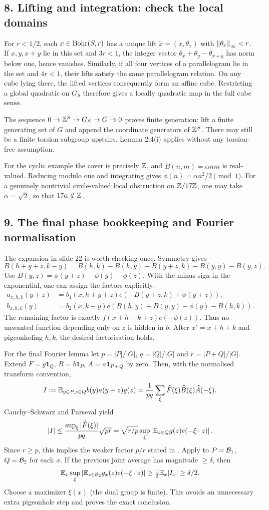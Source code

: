 \subsection*{8. Lifting and integration: check the local domains}
For $r<1/2$, each $x\in\operatorname{Bohr}(S,r)$ has a unique lift
$\widetilde x=(x,\theta_x)$ with $\left\|\theta_x\right\|_\infty<r$.
If $x,y,x+y$ lie in this set and $3r<1$, the integer vector
$\theta_x+\theta_y-\theta_{x+y}$ has norm below one, hence vanishes.
Similarly, if all four vertices of a parallelogram lie in the set and
$4r<1$, their lifts satisfy the same parallelogram relation. On any cube
lying there, the lifted vertices consequently form an affine cube.
Restricting a global quadratic on $G_S$ therefore gives a locally
quadratic map in the full cube sense.

The sequence $0\to\mathbb Z^S\to G_S\to G\to0$ proves finite generation:
lift a finite generating set of $G$ and append the coordinate generators
of $\mathbb Z^S$. There may still be a finite torsion subgroup upstairs.
Lemma 2.4(i) applies without any torsion-free assumption.

For the cyclic example the cover is precisely $\mathbb Z$, and
$\widetilde B(n,m)=\alpha nm$ is real-valued. Reducing modulo one and
integrating gives $\widetilde\phi(n)=\alpha n^2/2\pmod1$.
For a genuinely nontrivial circle-valued local obstruction on $\mathbb Z/17\mathbb Z$,
one may take $\alpha=\sqrt2$, so that $17\alpha\notin\mathbb Z$.

\subsection*{9. The final phase bookkeeping and Fourier normalisation}
The expansion in slide 22 is worth checking once. Symmetry gives
\[
B(h+y+z,k-y)=B(h,k)-B(h,y)+B(y+z,k)-B(y,y)-B(y,z).
\]
Use $B(y,z)=\phi(y+z)-\phi(y)-\phi(z)$. With the minus sign in the
exponential, one can assign the factors explicitly:
\[
\begin{aligned}
a_{x,h,k}(y+z)&=b_1(x,h+y+z)e(-B(y+z,k)+\phi(y+z)),\\
b_{x,h,k}(y)&=b_2(x,k-y)e(B(h,y)+B(y,y)-\phi(y)-B(h,k)).
\end{aligned}
\]
The remaining factor is exactly $f(x+h+k+z)e(-\phi(z))$.
Thus no unwanted function depending only on $z$ is hidden in $b$.
After $x'=x+h+k$ and pigeonholing $h,k$, the desired factorisation holds.

For the final Fourier lemma let $p=|P|/|G|$, $q=|Q|/|G|$ and
$r=|P+Q|/|G|$. Extend
$F=g\mathbf1_Q$, $B=b\mathbf1_P$, $A=a\mathbf1_{P+Q}$ by zero.
Then, with the normalised transform convention,
\[
I:=\mathbb E_{y\in P,z\in Q}b(y)a(y+z)g(z)
=\frac1{pq}\sum_\xi\widehat F(\xi)\widehat B(\xi)\widehat A(-\xi).
\]
Cauchy--Schwarz and Parseval yield
\[
|I|\leq\frac{\sup_\xi|\widehat F(\xi)|}{pq}\sqrt{pr}
=\sqrt{r/p}\sup_\xi\left|\mathbb E_{z\in Q}g(z)e(-\xi\cdot z)\right|.
\]
Since $r\geq p$, this implies the weaker factor $p/r$ stated in
. Apply to $P=\mathcal B_1$, $Q=\mathcal B_2$ for each $x$.
If the previous joint average has magnitude $\geq\delta$, then
\[\mathbb E_x\sup_\xi\left|\mathbb E_{z\in\mathcal B_2}g_x(z)e(-\xi\cdot z)\right|
\geq\tfrac12\mathbb E_x|I_x|\geq\delta/2.\]
Choose a maximizer $\xi(x)$ (the dual group is finite). This avoids
an unnecessary extra pigeonhole step and proves the exact conclusion.

